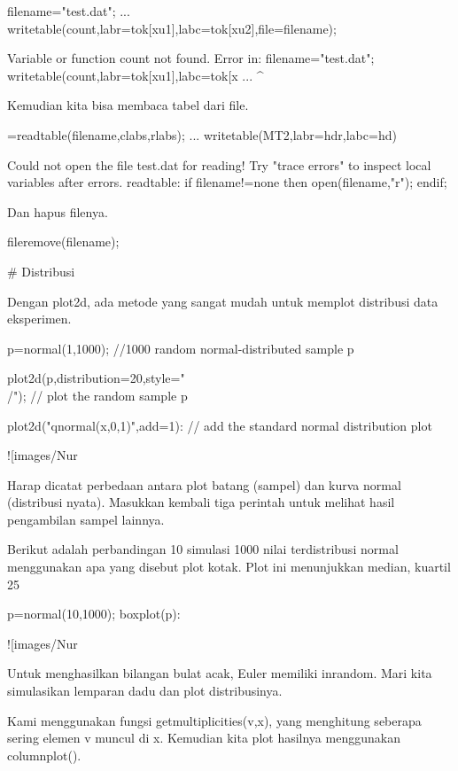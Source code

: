\documentclass{article}
\begin{document}
\>filename="test.dat"; ...  
\>   writetable(count,labr=tok[xu1],labc=tok[xu2],file=filename);


    Variable or function count not found.
    Error in:
    filename="test.dat"; writetable(count,labr=tok[xu1],labc=tok[x ...
                                         ^

Kemudian kita bisa membaca tabel dari file.


=readtable(filename,\>clabs,\>rlabs); ...  
\>   writetable(MT2,labr=hdr,labc=hd)


    Could not open the file
    test.dat
    for reading!
    Try "trace errors" to inspect local variables after errors.
    readtable:
        if filename!=none then open(filename,"r"); endif;

Dan hapus filenya.


\>fileremove(filename);


# Distribusi

Dengan plot2d, ada metode yang sangat mudah untuk memplot distribusi
data eksperimen.


\>p=normal(1,1000); //1000 random normal-distributed sample p

\>plot2d(p,distribution=20,style="\\/"); // plot the random sample p

\>plot2d("qnormal(x,0,1)",add=1): // add the standard normal distribution plot


![images/Nur%

Harap dicatat perbedaan antara plot batang (sampel) dan kurva normal
(distribusi nyata). Masukkan kembali tiga perintah untuk melihat hasil
pengambilan sampel lainnya.


Berikut adalah perbandingan 10 simulasi 1000 nilai terdistribusi
normal menggunakan apa yang disebut plot kotak. Plot ini menunjukkan
median, kuartil 25%


\>p=normal(10,1000); boxplot(p):


![images/Nur%

Untuk menghasilkan bilangan bulat acak, Euler memiliki inrandom. Mari
kita simulasikan lemparan dadu dan plot distribusinya.


Kami menggunakan fungsi getmultiplicities(v,x), yang menghitung
seberapa sering elemen v muncul di x. Kemudian kita plot hasilnya
menggunakan columnplot().
\end{document}
